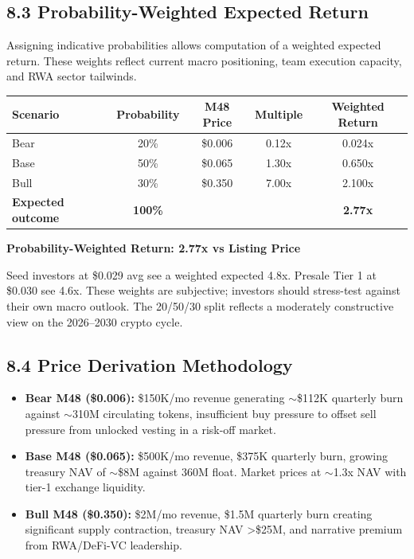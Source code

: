 \documentclass[
  paper=a4,
  ,captions=tableheading
]{scrartcl}
\providecommand{\tightlist}{%
  \setlength{\itemsep}{0pt}\setlength{\parskip}{0pt}}
\begin{document}
\subsection{8.3 Probability-Weighted Expected Return}\label{expected-return}

Assigning indicative probabilities allows computation of a weighted expected return. These weights reflect current macro positioning, team execution capacity, and RWA sector tailwinds.

\begin{center}
\begin{tabular}{lcccc}
\toprule
\textbf{Scenario} & \textbf{Probability} & \textbf{M48 Price} & \textbf{Multiple} & \textbf{Weighted Return} \\
\midrule
Bear & 20\% & \$0.006 & 0.12x & 0.024x \\
Base & 50\% & \$0.065 & 1.30x & 0.650x \\
Bull & 30\% & \$0.350 & 7.00x & 2.100x \\
\midrule
\textbf{Expected outcome} & \textbf{100\%} & & & \textbf{2.77x} \\
\bottomrule
\end{tabular}
\end{center}

\textbf{Probability-Weighted Return: 2.77x vs Listing Price}

Seed investors at \$0.029 avg see a weighted expected 4.8x. Presale Tier 1 at \$0.030 see 4.6x. These weights are subjective; investors should stress-test against their own macro outlook. The 20/50/30 split reflects a moderately constructive view on the 2026--2030 crypto cycle.

\subsection{8.4 Price Derivation Methodology}\label{price-derivation}

\begin{itemize}
\tightlist
\item
  \textbf{Bear M48 (\$0.006):} \$150K/mo revenue generating $\sim$\$112K quarterly burn against $\sim$310M circulating tokens, insufficient buy pressure to offset sell pressure from unlocked vesting in a risk-off market.
\item
  \textbf{Base M48 (\$0.065):} \$500K/mo revenue, \$375K quarterly burn, growing treasury NAV of $\sim$\$8M against 360M float. Market prices at $\sim$1.3x NAV with tier-1 exchange liquidity.
\item
  \textbf{Bull M48 (\$0.350):} \$2M/mo revenue, \$1.5M quarterly burn creating significant supply contraction, treasury NAV >\$25M, and narrative premium from RWA/DeFi-VC leadership.
\end{itemize}
\end{document}
